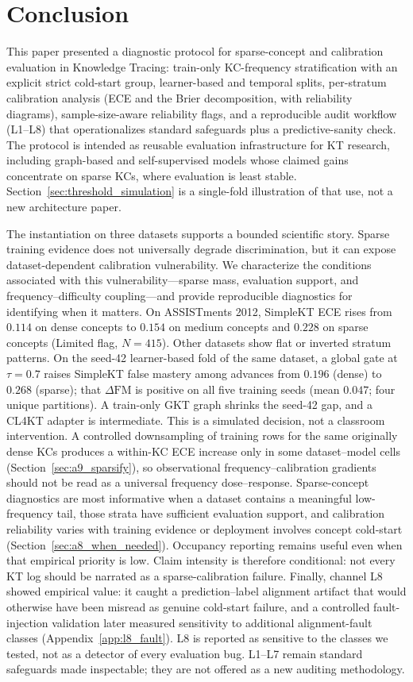 \section{Conclusion}
\label{sec:conclusion}
This paper presented a diagnostic protocol for sparse-concept and calibration evaluation in Knowledge Tracing: train-only KC-frequency stratification with an explicit strict cold-start group, learner-based and temporal splits, per-stratum calibration analysis (ECE and the Brier decomposition, with reliability diagrams), sample-size-aware reliability flags, and a reproducible audit workflow (L1--L8) that operationalizes standard safeguards plus a predictive-sanity check. The protocol is intended as reusable evaluation infrastructure for KT research, including graph-based and self-supervised models whose claimed gains concentrate on sparse KCs, where evaluation is least stable. Section~\ref{sec:threshold_simulation} is a single-fold illustration of that use, not a new architecture paper.

The instantiation on three datasets supports a bounded scientific story. Sparse training evidence does not universally degrade discrimination, but it can expose dataset-dependent calibration vulnerability. We characterize the conditions associated with this vulnerability---sparse mass, evaluation support, and frequency--difficulty coupling---and provide reproducible diagnostics for identifying when it matters. On ASSISTments 2012, SimpleKT ECE rises from $0.114$ on dense concepts to $0.154$ on medium concepts and $0.228$ on sparse concepts (Limited flag, $N = 415$). Other datasets show flat or inverted stratum patterns. On the seed-42 learner-based fold of the same dataset, a global gate at $\tau=0.7$ raises SimpleKT false mastery among advances from $0.196$ (dense) to $0.268$ (sparse); that $\Delta\mathrm{FM}$ is positive on all five training seeds (mean $0.047$; four unique partitions). A train-only GKT graph shrinks the seed-42 gap, and a CL4KT adapter is intermediate. This is a simulated decision, not a classroom intervention. A controlled downsampling of training rows for the same originally dense KCs produces a within-KC ECE increase only in some dataset--model cells (Section~\ref{sec:a9_sparsify}), so observational frequency--calibration gradients should not be read as a universal frequency dose--response. Sparse-concept diagnostics are most informative when a dataset contains a meaningful low-frequency tail, those strata have sufficient evaluation support, and calibration reliability varies with training evidence or deployment involves concept cold-start (Section~\ref{sec:a8_when_needed}). Occupancy reporting remains useful even when that empirical priority is low. Claim intensity is therefore conditional: not every KT log should be narrated as a sparse-calibration failure. Finally, channel L8 showed empirical value: it caught a prediction--label alignment artifact that would otherwise have been misread as genuine cold-start failure, and a controlled fault-injection validation later measured sensitivity to additional alignment-fault classes (Appendix~\ref{app:l8_fault}). L8 is reported as sensitive to the classes we tested, not as a detector of every evaluation bug. L1--L7 remain standard safeguards made inspectable; they are not offered as a new auditing methodology.

